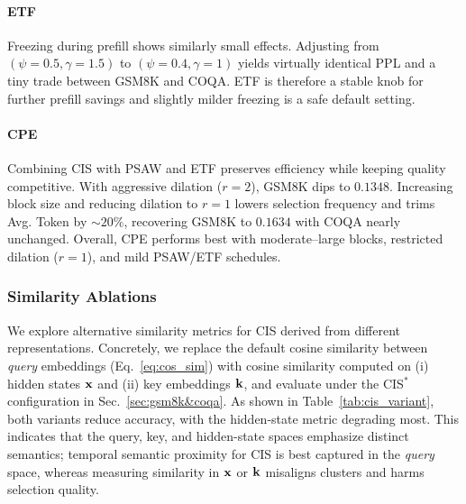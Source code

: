 \paragraph{ETF} Freezing during prefill shows similarly small effects. Adjusting from $(\psi{=}0.5,\gamma{=}1.5)$ to $(\psi{=}0.4,\gamma{=}1)$ yields virtually identical PPL and a tiny trade between GSM8K and COQA. ETF is therefore a stable knob for further prefill savings and slightly milder freezing is a safe default setting.

\paragraph{CPE} Combining CIS with PSAW and ETF preserves efficiency while keeping quality competitive. With aggressive dilation ($r{=}2$), GSM8K dips to $0.1348$. Increasing block size and reducing dilation to $r{=}1$ lowers selection frequency and trims Avg. Token by ${\sim}20\%$, recovering GSM8K to $0.1634$ with COQA nearly unchanged. Overall, CPE performs best with moderate–large blocks, restricted dilation ($r{=}1$), and mild PSAW/ETF schedules.






\subsubsection{Similarity Ablations} 

We explore alternative similarity metrics for CIS derived from different representations. Concretely, we replace the default cosine similarity between \emph{query} embeddings (Eq.~\ref{eq:cos_sim}) with cosine similarity computed on (i) hidden states $\mathbf{x}$ and (ii) key embeddings $\mathbf{k}$, and evaluate under the CIS$^\ast$ configuration in Sec.~\ref{sec:gsm8k&coqa}. As shown in Table~\ref{tab:cis_variant}, both variants reduce accuracy, with the hidden-state metric degrading most. This indicates that the query, key, and hidden-state spaces emphasize distinct semantics; temporal semantic proximity for CIS is best captured in the \emph{query} space, whereas measuring similarity in $\mathbf{x}$ or $\mathbf{k}$ misaligns clusters and harms selection quality.
